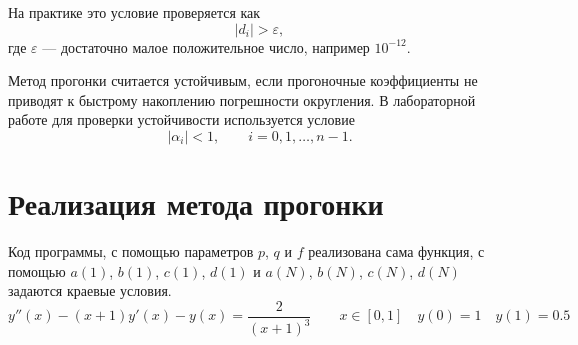 \documentclass[12pt,a4paper]{article}
\begin{document}
На практике это условие проверяется как
\begin{equation*}
    |d_i| > \varepsilon,
\end{equation*}
где $\varepsilon$ --- достаточно малое положительное число, например $10^{-12}$.

Метод прогонки считается устойчивым, если прогоночные коэффициенты не приводят к быстрому накоплению погрешности округления. В лабораторной работе для проверки устойчивости используется условие
\begin{equation*}
    |\alpha_i| < 1,
    \qquad i = 0,1,\ldots,n-1.
\end{equation*}

\section{Реализация метода прогонки}

Код программы, с помощью параметров $p$, $q$ и $f$ реализована сама функция, с помощью
$a(1)$, $b(1)$, $c(1)$, $d(1)$ и $a(N)$, $b(N)$, $c(N)$, $d(N)$ задаются краевые условия. 
\begin{equation*}
    y''(x) - (x + 1)y'(x) - y(x) = \frac{2}{(x + 1)^3}
    \qquad x \in [0, 1] \quad y(0) = 1 \quad y(1) = 0.5
\end{equation*}
\end{document}
